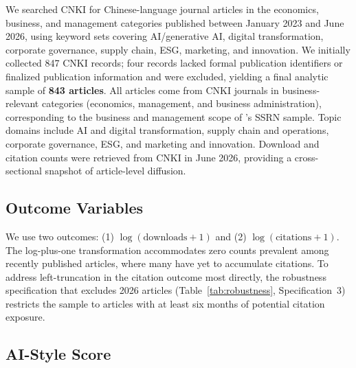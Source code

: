 \documentclass[12pt,a4paper]{article}
\begin{document}
We searched CNKI for Chinese-language journal articles in the
economics, business, and management categories published between
January 2023 and June 2026, using keyword sets covering
AI/generative AI, digital transformation, corporate governance,
supply chain, ESG, marketing, and innovation.
We initially collected 847 CNKI records; four records lacked formal
publication identifiers or finalized publication information and were
excluded, yielding a final analytic sample of \textbf{843 articles}.
All articles come from CNKI journals in business-relevant categories
(economics, management, and business administration), corresponding
to the business and management scope of \citet{JoLi2026}'s SSRN sample.
Topic domains include AI and digital transformation, supply chain and
operations, corporate governance, ESG, and marketing and innovation.
Download and citation counts were retrieved from CNKI in June 2026,
providing a cross-sectional snapshot of article-level diffusion.

\subsection{Outcome Variables}

We use two outcomes: (1) $\log(\text{downloads}+1)$ and
(2) $\log(\text{citations}+1)$.
The log-plus-one transformation accommodates zero counts prevalent
among recently published articles, where many have yet to accumulate
citations.
To address left-truncation in the citation outcome most directly,
the robustness specification that excludes 2026 articles
(Table~\ref{tab:robustness}, Specification~3) restricts the sample
to articles with at least six months of potential citation exposure.

\subsection{AI-Style Score}
\end{document}
